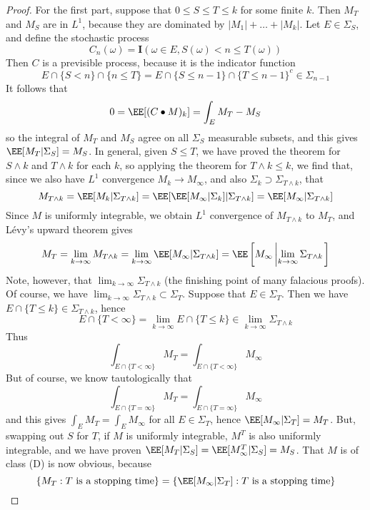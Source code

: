 \begin{proof}
    For the first part, suppose that $0 \leq S \leq T \leq k$ for some finite $k$. Then $M_T$ and $M_S$ are in $L^1$, because they are dominated by $|M_1| + \dots + |M_k|$. Let $E \in \Sigma_S$, and define the stochastic process
    \[ C_n(\omega) = \mathbf{I}(\omega \in E, S(\omega) < n \leq T(\omega)) \]
    Then $C$ is a previsible process, because it is the indicator function
    \[ E \cap \{ S < n \} \cap \{ n \leq T \} = E \cap \{ S \leq n-1 \} \cap \{ T \leq n-1 \}^c \in \Sigma_{n-1} \]
    It follows that
    \[ 0 = \EE[(C \bullet M)_k] = \int_E M_T - M_S \]
    so the integral of $M_T$ and $M_S$ agree on all $\Sigma_S$ measurable subsets, and this gives $\EE[M_T|\Sigma_S] = M_S$. In general, given $S \leq T$, we have proved the theorem for $S \wedge k$ and $T \wedge k$ for each $k$, so applying the theorem for $T \wedge k \leq k$, we find that, since we also have $L^1$ convergence $M_k \to M_\infty$, and also $\Sigma_k \supset \Sigma_{T \wedge k}$, that
    \[ M_{T \wedge k} = \EE[M_k|\Sigma_{T \wedge k}] = \EE[\EE[M_\infty|\Sigma_k]|\Sigma_{T \wedge k}] = \EE[M_\infty|\Sigma_{T \wedge k}] \]
    Since $M$ is uniformly integrable, we obtain $L^1$ convergence of $M_{T \wedge k}$ to $M_T$, and L\'{e}vy's upward theorem gives
    \[ M_T = \lim_{k \to \infty} M_{T \wedge k} = \lim_{k \to \infty} \EE[M_\infty|\Sigma_{T \wedge k}] = \EE \left[M_\infty \left| \lim_{k \to \infty} \Sigma_{T \wedge k} \right. \right] \]
    Note, however, that $\lim_{k \to \infty} \Sigma_{T \wedge k}$ (the finishing point of many falacious proofs). Of course, we have $\lim_{k \to \infty} \Sigma_{T \wedge k} \subset \Sigma_T$. Suppose that $E \in \Sigma_T$. Then we have $E \cap \{ T \leq k \} \in \Sigma_{T \wedge k}$, hence
    \[ E \cap \{ T < \infty \} = \lim_{k \to \infty} E \cap \{ T \leq k \} \in \lim_{k \to \infty} \Sigma_{T \wedge k} \]
    Thus
    \[ \int_{E \cap \{ T < \infty \}} M_T = \int_{E \cap \{ T < \infty \}} M_\infty \]
    But of course, we know tautologically that
    \[ \int_{E \cap \{ T = \infty \}} M_T = \int_{E \cap \{ T = \infty \}} M_\infty \]
    and this gives $\int_E M_T = \int_E M_\infty$ for all $E \in \Sigma_T$, hence $\EE[M_\infty|\Sigma_T] = M_T$. But, swapping out $S$ for $T$, if $M$ is uniformly integrable, $M^T$ is also uniformly integrable, and we have proven $\EE[M_T|\Sigma_S] = \EE[M^T_\infty|\Sigma_S] = M_S$. That $M$ is of class (D) is now obvious, because
    \[ \{ M_T: T\ \text{is a stopping time} \} = \{ \EE[M_\infty|\Sigma_T]: T\ \text{is a stopping time} \} \]

\end{proof}
